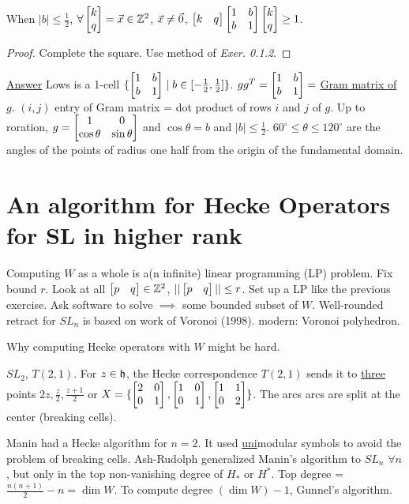 \documentclass[]{article}
\begin{document}
\begin{lemma}
	When $|b|\leq \frac{1}{2}$, $\forall \begin{bmatrix}k\\q\end{bmatrix} = \vec{x} \in \mathbb{Z}^2$, $\vec{x}\neq \vec{0}$, $\begin{bmatrix}k&q\end{bmatrix} \begin{bmatrix}1&b\\b&1\end{bmatrix}\begin{bmatrix}k\\q\end{bmatrix} \geq 1$.
\end{lemma}
\begin{proof}
	Complete the square. Use method of \textit{Exer. 0.1.2}.
\end{proof}
\ul{Answer} Lows is a 1-cell $\{\begin{bmatrix}1&b\\b&1\end{bmatrix} \mid b\in[-\frac{1}{2},\frac{1}{2}]\}$. $gg^T = \begin{bmatrix}1&b\\b&1\end{bmatrix} = $ \ul{Gram matrix of $g$}. $(i,j)$ entry of Gram matrix = dot product of rows $i$ and $j$ of $g$. Up to roration, $g = \begin{bmatrix}1&0\\\cos\theta&\sin\theta\end{bmatrix}$ and $\cos\theta = b$ and $|b|\leq \frac{1}{2}$. $60^\circ \leq \theta \leq 120^\circ$ are the angles of the points of radius one half from the origin of the fundamental domain.

\section*{An algorithm for Hecke Operators for SL in higher rank}

Computing $W$ as a whole is a(n infinite) linear programming (LP) problem. Fix bound $r$. Look at all $\begin{bmatrix}p&q\end{bmatrix}\in\mathbb{Z}^2$, $||\begin{bmatrix}p&q\end{bmatrix}||\leq r$. Set up a LP like the previous exercise. Ask software to solve $\implies$ some bounded subset of $W$. 
Well-rounded retract for $SL_n$ is based on work of Voronoi (1998). modern: Voronoi polyhedron.

Why computing Hecke operators with $W$ might be hard.

\begin{example}
	$SL_2$, $T(2,1)$. For $z\in \frak{h}$, the Hecke correspondence $T(2,1)$ sends it to \ul{three} points $2z,\frac{z}{2}, \frac{z+1}{2}$ or $X = \{\begin{bmatrix}2&0\\0&1\end{bmatrix},\begin{bmatrix}1&0\\0&1\end{bmatrix},\begin{bmatrix}1&1\\0&2\end{bmatrix}\}$. The arcs arcs are split at the center (breaking cells).
\end{example}
Manin had a Hecke algorithm for $n=2$. It used \ul{uni}modular symbols to avoid the problem of breaking cells. Ash-Rudolph generalized Manin's algorithm to $SL_n$ $\forall n$, but only in the top non-vanishing degree of $H_*$ or $H^*$. Top degree = $\frac{n(n+1)}{2}-n = \dim W$. To compute degree $(\dim W)-1$, Gunnel's algorithm.
\end{document}
